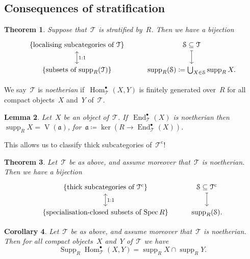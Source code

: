 \documentclass[10pt,a4paper]{article}
\theoremstyle{lecture}
\newtheorem{theorem}{Theorem}
\newtheorem{corollary}[theorem]{Corollary}
\newtheorem{lemma}[theorem]{Lemma}
\newcommand\cc{\ensuremath{\mathrm{c}}}
\DeclareMathOperator\End{End}
\DeclareMathOperator\Hom{Hom}
\DeclareMathOperator\Spec{Spec}
\DeclareMathOperator\Supp{Supp}
\DeclareMathOperator\supp{supp}
\DeclareMathOperator\VV{V}
\begin{document}
\subsection{Consequences of stratification}
\begin{theorem}
  Suppose that~$\mathcal{T}$ is stratified by~$R$. Then we have a bijection
  \begin{equation}
    \begin{tikzcd}
      \left\{ \text{localising subcategories of~$\mathcal{T}$} \right\} \arrow[leftrightarrow]{d}{1:1} & \mathcal{S}\subseteq\mathcal{T} \arrow[mapsto]{d} \\
      \left\{ \text{subsets of $\supp_R(\mathcal{T})$} \right\} & \supp_R(\mathcal{S})\coloneqq\bigcup_{X\in\mathcal{S}}\supp_R X.
    \end{tikzcd}
  \end{equation}
\end{theorem}

We say~$\mathcal{T}$ is \emph{noetherian} if~$\Hom_{\mathcal{T}}^\bullet(X,Y)$ is finitely generated over~$R$ for all compact objects~$X$ and~$Y$ of~$\mathcal{T}$.
\begin{lemma}
  Let~$X$ be an object of~$\mathcal{T}$. If~$\End_{\mathcal{T}}^\bullet(X)$ is noetherian then~$\supp_R X=\VV(\mathfrak{a})$, for~$\mathfrak{a}\coloneqq\ker(R\to\End_{\mathcal{T}}^\bullet(X))$.
\end{lemma}
This allows us to classify thick subcategories of~$\mathcal{T}^\cc$!
\begin{theorem}
  Let~$\mathcal{T}$ be as above, and assume moreover that~$\mathcal{T}$ is noetherian. Then we have a bijection
  \begin{equation}
    \begin{tikzcd}
      \left\{ \text{thick subcategories of~$\mathcal{T}^\cc$} \right\} \arrow[leftrightarrow]{d}{1:1} & \mathcal{S}\subseteq\mathcal{T}^\cc \arrow[mapsto]{d} \\
      \left\{ \text{specialisation-closed subsets of $\Spec R$} \right\} & \supp_R(\mathcal{S}).
    \end{tikzcd}
  \end{equation}
\end{theorem}
\begin{corollary}
  Let~$\mathcal{T}$ be as above, and assume moreover that~$\mathcal{T}$ is noetherian. Then for all compact objects~$X$ and~$Y$ of~$\mathcal{T}$ we have
  \begin{equation}
    \Supp_R\Hom_{\mathcal{T}}^\bullet(X,Y)=\supp_R X\cap\supp_R Y.
  \end{equation}
\end{corollary}
\end{document}
